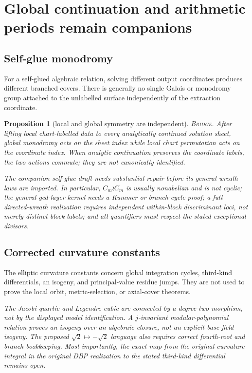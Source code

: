 \documentclass[11pt]{article}
\newtheorem{proposition}[theorem]{Proposition}
\theoremstyle{remark}
\newcommand{\status}[1]{\textup{\textsc{#1}}}
\newcommand{\bridge}{\status{Bridge}}
\newcommand{\proofstop}[1]{\par\medskip\noindent{\color{red!75!black}\textbf{STOP--PROOF.}} \textit{#1}\par\medskip}
\begin{document}
\section{Global continuation and arithmetic periods remain companions}

\subsection{Self-glue monodromy}

For a self-glued algebraic relation, solving different output coordinates produces
different branched covers. There is generally no single Galois or monodromy
group attached to the unlabelled surface independently of the extraction
coordinate.

\begin{proposition}[local and global symmetry are independent]
\bridge.
After lifting local chart-labelled data to every analytically continued
solution sheet, global monodromy acts on the sheet index while local chart
permutation acts on the coordinate index. When analytic continuation preserves
the coordinate labels, the two actions commute; they are not canonically
identified.
\end{proposition}

\proofstop{The companion self-glue draft needs substantial repair before
its general wreath laws are imported. In particular, $C_m\wr C_m$ is
usually nonabelian and is not cyclic; the general gcd-layer kernel needs a
Kummer or branch-cycle proof; a full directed-wreath realization requires independent
within-block discriminant loci, not merely distinct block labels; and all
quantifiers must respect the stated exceptional divisors.}

\subsection{Corrected curvature constants}

The elliptic curvature constants concern global integration cycles,
third-kind differentials, an isogeny, and principal-value residue jumps.
They are not used to prove the local orbit, metric-selection, or axial-cover
theorems.

\proofstop{The Jacobi quartic and Legendre cubic are connected by a
degree-two morphism, not by the displayed model identification. A
$j$-invariant modular-polynomial relation proves an isogeny over an
algebraic closure, not an explicit base-field isogeny. The proposed
$\sqrt2\mapsto-\sqrt2$ language also requires correct fourth-root
and branch bookkeeping. Most importantly, the exact map from the original
curvature integral in the original DBP realization to the stated third-kind
differential remains open.}
\end{document}
